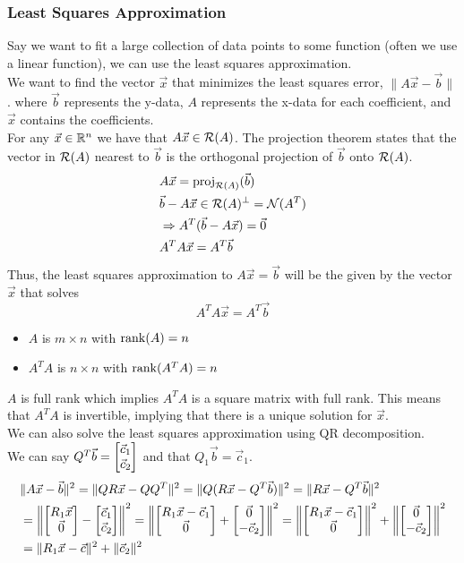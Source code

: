 \documentclass[11pt, fleqn]{article}
\begin{document}
\subsubsection{Least Squares Approximation}
Say we want to fit a large collection of data points to some function (often we use a linear function), we can use the least squares approximation.\\
We want to find the vector $\vec{x}$ that minimizes the least squares error, $\|A\vec{x}-\vec{b}\|$. where $\vec{b}$ represents the y-data, $A$ represents the x-data for each coefficient, and $\vec{x}$ contains the coefficients.\\
For any $\vec{x}\in\mathbb{R}^n$ we have that $A\vec{x}\in\mathcal{R}(A)$. The projection theorem states that the vector in $\mathcal{R}(A)$ nearest to $\vec{b}$ is the orthogonal projection of $\vec{b}$ onto $\mathcal{R}(A)$.
\begin{align*}
    &A\vec{x}=\operatorname{proj}_{\mathcal{R}(A)}(\vec{b})\\
    &\vec{b}-A\vec{x}\in\mathcal{R}(A)^\perp=\mathcal{N}(A^T)\\
    &\Rightarrow A^T(\vec{b}-A\vec{x})=\vec{0}\\
    &A^TA\vec{x}=A^T\vec{b}
\end{align*}
Thus, the least squares approximation to $A\vec{x}=\vec{b}$ will be the given by the vector $\vec{x}$ that solves
$$A^TA\vec{x}=A^T\vec{b}$$
\begin{itemize}
    \item $A$ is $m\times n$ with $\operatorname{rank}(A)=n$
    \item $A^TA$ is $n\times n$ with $\operatorname{rank}(A^TA)=n$
\end{itemize}
$A$ is full rank which implies $A^TA$ is a square matrix with full rank. This means that $A^TA$ is invertible, implying that there is a unique solution for $\vec{x}$.\\
We can also solve the least squares approximation using QR decomposition.\\
We can say $Q^T\vec{b}=\matrixx{\vec{c}_1\\\vec{c}_2}$ and that $Q_1\vec{b}=\vec{c}_1$.
\begin{align*}
    &\|A\vec{x}-\vec{b}\|^2=\|QR\vec{x}-QQ^T\|^2=\|Q(R\vec{x}-Q^T\vec{b})\|^2=\|R\vec{x}-Q^T\vec{b}\|^2\\
    &=\left\|\matrixx{R_1\vec{x}\\\vec{0}}-\matrixx{\vec{c}_1\\\vec{c}_2}\right\|^2=\left\|\matrixx{R_1\vec{x}-\vec{c}_1\\\vec{0}}+\matrixx{\vec{0}\\-\vec{c}_2}\right\|^2=\left\|\matrixx{R_1\vec{x}-\vec{c}_1\\\vec{0}}\right\|^2+\left\|\matrixx{\vec{0}\\-\vec{c}_2}\right\|^2\\
    &=\|R_1\vec{x}-\vec{c}\|^2+\|\vec{c}_2\|^2
\end{align*}
\end{document}
